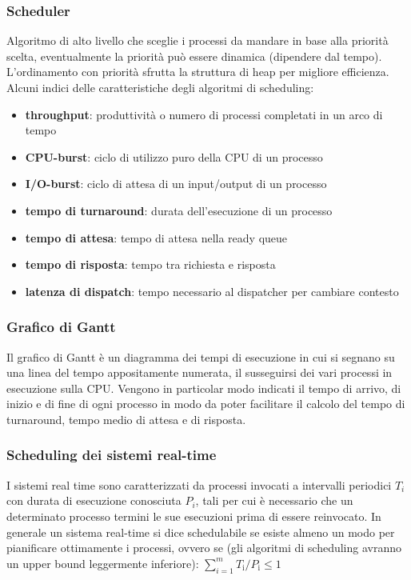 \documentclass[a4paper]{article}
\begin{document}
\subsubsection*{Scheduler}
Algoritmo di alto livello che sceglie i processi da mandare in base alla priorità scelta, eventualmente la priorità può essere
dinamica (dipendere dal tempo). L'ordinamento con priorità sfrutta la struttura di heap per migliore efficienza. Alcuni indici
delle caratteristiche degli algoritmi di scheduling:
\begin{itemize}
	\item \textbf{throughput}: produttività o numero di processi completati in un arco di tempo
	\item \textbf{CPU-burst}: ciclo di utilizzo puro della CPU di un processo
	\item \textbf{I/O-burst}: ciclo di attesa di un input/output di un processo
	\item \textbf{tempo di turnaround}: durata dell'esecuzione di un processo
	\item \textbf{tempo di attesa}: tempo di attesa nella ready queue
	\item \textbf{tempo di risposta}: tempo tra richiesta e risposta
	\item \textbf{latenza di dispatch}: tempo necessario al dispatcher per cambiare contesto
\end{itemize}

\subsubsection*{Grafico di Gantt}
Il grafico di Gantt è un diagramma dei tempi di esecuzione in cui si segnano su una linea del tempo appositamente numerata, il
susseguirsi dei vari processi in esecuzione sulla CPU. Vengono in particolar modo indicati il tempo di arrivo, di inizio e di
fine di ogni processo in modo da poter facilitare il calcolo del tempo di turnaround, tempo medio di attesa e di risposta.

\subsubsection*{Scheduling dei sistemi real-time}
I sistemi real time sono caratterizzati da processi invocati a intervalli periodici \(T_i\) con durata di esecuzione conosciuta
\(P_i\), tali per cui è necessario che un determinato processo termini le sue esecuzioni prima di essere reinvocato. In generale
un sistema real-time si dice schedulabile se esiste almeno un modo per pianificare ottimamente i processi, ovvero se (gli
algoritmi di scheduling avranno un upper bound leggermente inferiore):
\(\sum_{i=1}^{m} T_\text{i} / P_\text{i} \leq 1\)
\end{document}
